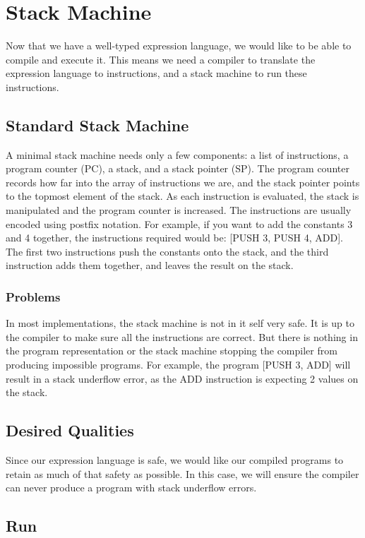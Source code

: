\section{Stack Machine}
\label{sec:stack-machine}
Now that we have a well-typed expression language, we would like to be able to compile and execute it. This means we need a compiler to translate the expression language to instructions, and a stack machine to run these instructions.

\subsection{Standard Stack Machine}
A minimal stack machine needs only a few components: a list of instructions, a program counter (PC), a stack, and a stack pointer (SP). The program counter records how far into the array of instructions we are, and the stack pointer points to the topmost element of the stack. As each instruction is evaluated, the stack is manipulated and the program counter is increased. The instructions are usually encoded using postfix notation. For example, if you want to add the constants 3 and 4 together, the instructions required would be: [PUSH 3, PUSH 4, ADD]. The first two instructions push the constants onto the stack, and the third instruction adds them together, and leaves the result on the stack.

\subsubsection{Problems}
In most implementations, the stack machine is not in it self very safe. It is up to the compiler to make sure all the instructions are correct. But there is nothing in the program representation or the stack machine stopping the compiler from producing impossible programs. For example, the program [PUSH 3, ADD] will result in a stack underflow error, as the ADD instruction is expecting 2 values on the stack.

\subsection{Desired Qualities}
Since our expression language is safe, we would like our compiled programs to retain as much of that safety as possible. In this case, we will ensure the compiler can never produce a program with stack underflow errors.



\subsection{Run}
